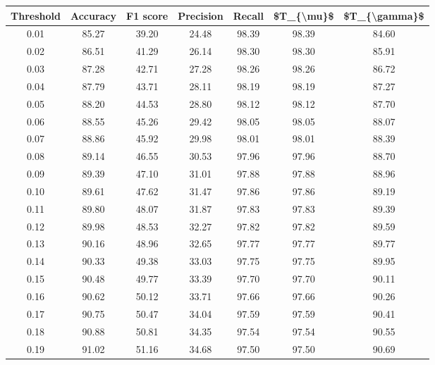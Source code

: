 \begin{tabular}{|c|c|c|c|c|c|c|}
\hline
 Threshold &  Accuracy &  F1 score &  Precision &  Recall &  \$T\_\{\textbackslash mu\}\$ &  \$T\_\{\textbackslash gamma\}\$ \\
\hline
      0.01 &     85.27 &     39.20 &      24.48 &   98.39 &      98.39 &         84.60 \\
      0.02 &     86.51 &     41.29 &      26.14 &   98.30 &      98.30 &         85.91 \\
      0.03 &     87.28 &     42.71 &      27.28 &   98.26 &      98.26 &         86.72 \\
      0.04 &     87.79 &     43.71 &      28.11 &   98.19 &      98.19 &         87.27 \\
      0.05 &     88.20 &     44.53 &      28.80 &   98.12 &      98.12 &         87.70 \\
      0.06 &     88.55 &     45.26 &      29.42 &   98.05 &      98.05 &         88.07 \\
      0.07 &     88.86 &     45.92 &      29.98 &   98.01 &      98.01 &         88.39 \\
      0.08 &     89.14 &     46.55 &      30.53 &   97.96 &      97.96 &         88.70 \\
      0.09 &     89.39 &     47.10 &      31.01 &   97.88 &      97.88 &         88.96 \\
      0.10 &     89.61 &     47.62 &      31.47 &   97.86 &      97.86 &         89.19 \\
      0.11 &     89.80 &     48.07 &      31.87 &   97.83 &      97.83 &         89.39 \\
      0.12 &     89.98 &     48.53 &      32.27 &   97.82 &      97.82 &         89.59 \\
      0.13 &     90.16 &     48.96 &      32.65 &   97.77 &      97.77 &         89.77 \\
      0.14 &     90.33 &     49.38 &      33.03 &   97.75 &      97.75 &         89.95 \\
      0.15 &     90.48 &     49.77 &      33.39 &   97.70 &      97.70 &         90.11 \\
      0.16 &     90.62 &     50.12 &      33.71 &   97.66 &      97.66 &         90.26 \\
      0.17 &     90.75 &     50.47 &      34.04 &   97.59 &      97.59 &         90.41 \\
      0.18 &     90.88 &     50.81 &      34.35 &   97.54 &      97.54 &         90.55 \\
      0.19 &     91.02 &     51.16 &      34.68 &   97.50 &      97.50 &         90.69 \\

\end{tabular}
